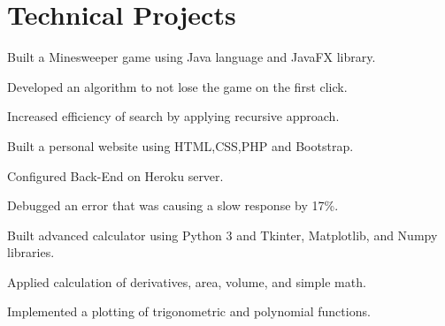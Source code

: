 \documentclass[]{deedy-resume-openfont}
\begin{document}
\begin{minipage}[t]{0.40\textwidth}
%
%

\end{minipage} 
\hfill
\begin{minipage}[t]{0.59\textwidth} 



\section{Technical Projects}


\sectionsep
\begin{tightemize}
\item Built a Minesweeper game using Java language and JavaFX library.
\item Developed an algorithm  to not lose the game on the first click.
\item Increased efficiency of search by applying recursive approach.

\end{tightemize}

\sectionsep




\begin{tightemize}
\item Built a personal website using HTML,CSS,PHP and Bootstrap.
\item Configured Back-End on Heroku server.
\item Debugged an error that was causing a slow response by 17\%.
\end{tightemize}
\sectionsep

\begin{tightemize}
\item Built advanced calculator using Python 3 and Tkinter, Matplotlib, and Numpy libraries.
\item Applied calculation of derivatives, area, volume, and simple math.
\item Implemented a plotting of trigonometric and polynomial functions.


\end{tightemize}
\end{minipage}
\end{document}
